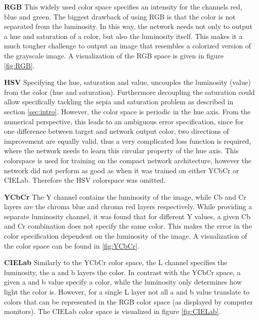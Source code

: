 
\textbf{RGB} This widely used color space specifies an intensity for the channels red, blue and green. The biggest drawback of using RGB is that the color is not separated from the luminosity. In this way, the network needs not only to output a hue and saturation of a color, but also the luminosity itself. This makes it a much tougher challenge to output an image that resembles a colorized version of the grayscale image. A visualization of the RGB space is given in figure \ref{fig:RGB}.

\textbf{HSV} Specifying the hue, saturation and value, uncouples the luminosity (value) from the color (hue and saturation). Furthermore decoupling the saturation could allow specifically tackling the sepia and saturation problem as described in section \ref{sec:intro}. However, the color space is periodic in the hue axis. From the numerical perspective, this leads to an ambiguous error specification, since for one difference between target and network output color, two directions of improvement are equally valid, thus a very complicated loss function is required, where the network needs to learn this circular property of the hue axis. This colorspace is used for training on the compact network architecture, however the network did not perform as good as when it was trained on either YCbCr or CIELab. Therefore the HSV colorspace was omitted.

\textbf{YCbCr} The Y channel contains the luminosity of the image, while Cb and Cr layers are the chroma blue and chroma red layers respectively. While providing a separate luminosity channel, it was found that for different Y values, a given Cb and Cr combination does not specify the same color. This makes the error in the color specification dependent on the luminosity of the image. A visualization of the color space can be found in \ref{fig:YCbCr}.

\textbf{CIELab} Similarly to the YCbCr color space, the L channel specifies the luminosity, the a and b layers the color. In contrast with the YCbCr space, a given a and b value specify a color, while the luminosity only determines how light the color is. However, for a single L layer not all a and b value translate to colors that can be represented in the RGB color space (as displayed by computer monitors). The CIELab color space is visualized in figure \ref{fig:CIELab}.\\

